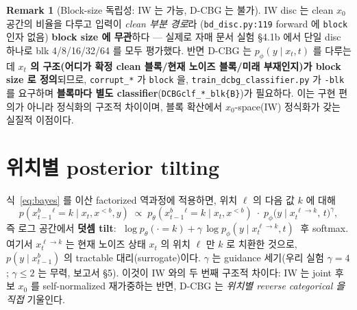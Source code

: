 \documentclass[11pt]{article}
\newcommand{\code}[1]{\texttt{\small #1}}
\newcommand{\xpre}{x^{<b}}
\newcommand{\xblk}{x^{b}}
\newcommand{\pth}{p_\theta}
\newcommand{\pphi}{p_\phi}
\theoremstyle{plain}
\theoremstyle{definition}
\newtheorem{remark}{Remark}
\begin{document}
\begin{remark}[Block-size 독립성: IW 는 가능, D-CBG 는 불가]\label{rem:blockdep}
IW disc 는 clean $x_0$ 공간의 비율을 다루고 입력이 \emph{clean 부분 경로}라
(\code{bd\_disc.py:119} forward 에 \code{block} 인자 없음) \textbf{block size 에 무관}하다 —
실제로 자매 문서 실험 §4.1b 에서 단일 disc 하나로 blk 4/8/16/32/64 를 모두 평가했다.
반면 D-CBG 는 $p_\phi(y\mid x_t,t)$ 를 다루는데 \textbf{$x_t$ 의 구조(어디가 확정 clean 블록/현재 노이즈 블록/미래 부재인지)가 block size 로 정의}되므로,
\code{corrupt\_*} 가 \code{block} 을, \code{train\_dcbg\_classifier.py} 가 \code{-blk} 를 요구하며
\textbf{블록마다 별도 classifier}(\code{DCBGclf\_*\_blk\{B\}})가 필요하다. 이는 구현 편의가 아니라
정식화의 구조적 차이이며, 블록 확산에서 $x_0$-space(IW) 정식화가 갖는 실질적 이점이다.
\end{remark}

\section{위치별 posterior tilting}
식~\eqref{eq:bayes} 를 이산 factorized 역과정에 적용하면, 위치 $\ell$ 의 다음 값 $k$ 에 대해
\begin{equation}
p(\xblk_{t-1}{}^{\ell}=k\mid x_t,\xpre,y)
\;\propto\;
\pth(\xblk_{t-1}{}^{\ell}=k\mid x_t,\xpre)\;\cdot\;
\pphi\!\big(y\mid x_t^{\,\ell\to k},\,t\big)^{\gamma},
\label{eq:tilt}
\end{equation}
즉 로그 공간에서 \textbf{덧셈 tilt}:
$\;\log\pth(\cdot=k) + \gamma\,\log\pphi(y\mid x_t^{\ell\to k},t)\;$ 후 softmax.
여기서 $x_t^{\ell\to k}$ 는 현재 노이즈 상태 $x_t$ 의 위치 $\ell$ 만 $k$ 로 치환한 것으로,
$p(y\mid \xblk_{t-1})$ 의 tractable 대리(surrogate)이다.
$\gamma$ 는 guidance 세기(우리 실험 $\gamma=4$; $\gamma\le2$ 는 무력, 보고서 §5).
이것이 IW 와의 두 번째 구조적 차이다: IW 는 joint 후보 $x_0$ 를 self-normalized 재가중하는 반면,
D-CBG 는 \emph{위치별 reverse categorical 을 직접} 기울인다.

\end{document}
